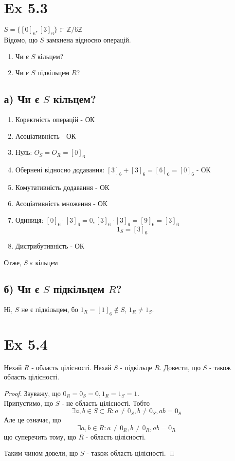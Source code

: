 \documentclass[11pt, a4paper]{article} %
\newcommand{\Z}{\mathbb{Z}}
\begin{document}
\section*{Ex 5.3}
\begin{mdframed}
    $S = \{[0]_6, [3]_6\} \subset \Z/6\Z$\\
    Відомо, що $S$ замкнена відносно операцій.
    \begin{enumerate}
        \item Чи є $S$ кільцем?
        \item Чи є $S$ підкільцем $R$?
    \end{enumerate}
\end{mdframed}

\subsection*{а) Чи є $S$ кільцем?}
\begin{enumerate}
    \item Коректність операцій - ОК
    \item Асоціативність - ОК
    \item Нуль: $O_S = O_R = [0]_6$
    \item Обернені відносно додавання: $[3]_6+[3]_6=[6]_6=[0]_6$ - ОК
    \item Комутативність додавання - ОК
    \item Асоціативність множення - ОК
    \item Одиниця: $[0]_6\cdot [3]_6 = 0, [3]_6\cdot [3]_6 = [9]_6 = [3]_6$
    \[1_S = [3]_6\]
    \item Дистрибутивність - ОК
\end{enumerate}
Отже, $S$ є кільцем

\subsection*{б) Чи є $S$ підкільцем $R$?}
Ні, $S$ не є підкільцем, бо $1_R = [1]_6 \notin S$, $1_R \ne 1_S$.

\section*{Ex 5.4}
\begin{mdframed}
    Нехай $R$ - область цілісності.
    Нехай $S$ - підкільце $R$.
    Довести, що $S$ - також область цілісності. 
\end{mdframed}

\begin{proof}
    Зауважу, що $0_R = 0_S = 0, 1_R = 1_S = 1$.\\
    Припустимо, що $S$ - не область цілісності.
    Тобто
    \[\exists a,b\in S\subset R : a\ne 0_S, b\ne 0_S, ab = 0_S\]
    Але це означає, що 
    \[\exists a,b\in R: a\ne 0_R, b\ne 0_R, ab=0_R\]
    що суперечить тому, що $R$ - область цілісності.
    
    Таким чином довели, що $S$ - також область цілісності.
\end{proof}
\end{document}

